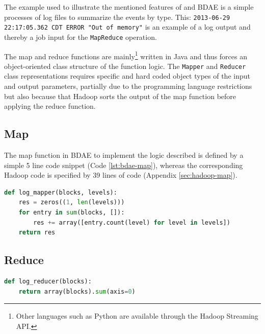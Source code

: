 The example used to illustrate the mentioned features of \CodeName and BDAE is a simple processes of log files to summarize the events by type\cite{PageTomWheeler}. This: \texttt{2013-06-29 22:17:05.362 CDT ERROR "Out of memory"} is an example of a log output and thereby a job input for the \texttt{MapReduce} operation. 
\newline

The map and reduce functions are mainly\footnote{Other languages such as Python are available through the Hadoop Streaming API.} written in Java and thus forces an object-oriented class structure of the function logic. The \texttt{Mapper} and \texttt{Reducer} class representations requires specific and hard coded object types of the input and output parameters, partially due to the programming language restrictions but also because that Hadoop sorts the output of the map function before applying the reduce function.

\subsection{Map}
The map function in BDAE to implement the logic described is defined by a simple 5 line code snippet (Code \ref{lst:bdae-map}), whereas the corresponding Hadoop code is specified by 39 lines of code (Appendix \ref{sec:hadoop-map}).
\begin{center}
\begin{lstlisting}[basicstyle=\fontsize{5}{5}\selectfont\ttfamily, language=Python, xleftmargin=0.8cm, caption={BDAE map function}, label={lst:bdae-map}]
def log_mapper(blocks, levels):
    res = zeros((1, len(levels)))
    for entry in sum(blocks, []):
        res += array([entry.count(level) for level in levels])
    return res
\end{lstlisting}
\end{center}

\subsection{Reduce}
\begin{lstlisting}[basicstyle=\fontsize{5}{5}\selectfont\ttfamily, language=Python, xleftmargin=0.8cm, caption={BDAE reduce function}, label={lst:bdae-reduce}]
def log_reducer(blocks):
    return array(blocks).sum(axis=0)
\end{lstlisting}